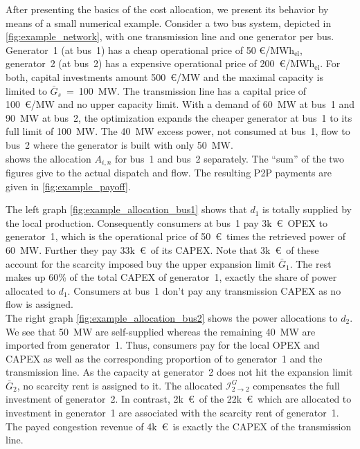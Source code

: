 \documentclass[11pt,twocolumn]{article}
\newcommand{\kk}{k~\euro~}
\newcommand{\capacitygenerationupper}{\bar{G}_{s}}
\newcommand{\megawatthour}{MWh$_\text{el}$}
\newcommand{\capexgeneration}{\mathcal{I}^G}
\newcommand{\allocatecapexgeneration}[1][n \rightarrow s,t]{\capexgeneration_{#1}}
\begin{document}
After presenting the basics of the cost allocation, we present its behavior by means of a small numerical example.  
Consider a two bus system, depicted in \cref{fig:example_network}, with one transmission line and one generator per bus. Generator~1 (at bus~1) has a cheap operational price of 50 \euro/\megawatthour, generator~2 (at bus~2) has a expensive operational price of 200~\euro/\megawatthour. For both, capital investments amount 500~\euro/MW and the maximal capacity is limited to $\capacitygenerationupper$~=~100~MW. The transmission line has a capital price of 100~\euro/MW and no upper capacity limit. With a demand of 60~MW at bus~1 and 90~MW at bus~2, the optimization expands the cheaper generator at bus~1 to its full limit of 100~MW. The 40~MW excess power, not consumed at bus~1, flow to bus~2 where the generator is built with only 50~MW. \\
% 
 shows the allocation $A_{i,n}$ for bus~1 and bus~2 separately. The ``sum'' of the two figures give to the actual dispatch and flow. The resulting P2P payments are given in \cref{fig:example_payoff}.  

The left graph \cref{fig:example_allocation_bus1} shows that $d_1$ is totally supplied by the local production. Consequently consumers at bus~1 pay 3k~\euro~OPEX to generator~1, which is the operational price of 50~\euro\, times the retrieved power of 60~MW. Further they pay 33\kk of its CAPEX. Note that 3\kk of these account for the scarcity imposed buy the upper expansion limit $\bar{G}_1$. The rest makes up 60\% of the total CAPEX of generator~1, exactly the share of power allocated to $d_1$. Consumers at bus~1 don't pay any transmission CAPEX as no flow is assigned. \\
The right graph \cref{fig:example_allocation_bus2} shows the power allocations to $d_2$. We see that 50~MW are self-supplied whereas the remaining 40~MW are imported from generator~1. Thus, consumers pay for the local OPEX and CAPEX as well as the corresponding proportion of to generator~1 and the transmission line. As the capacity at generator~2 does not hit the expansion limit $\bar{G}_2$, no scarcity rent is assigned to it. The allocated $\allocatecapexgeneration[2\rightarrow 2]$  compensates  the full investment of generator~2. In contrast, 2\kk of the 22\kk which are allocated to investment in generator~1 are associated with the scarcity rent of generator~1. The payed congestion revenue of 4\kk is exactly the CAPEX of the transmission line.   
\end{document}
